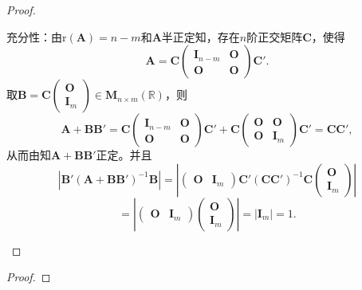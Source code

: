 \documentclass[../../main.tex]{subfiles}
\begin{document}
\begin{proof}
\begin{enumerate}[(1)]
{\heiti 充分性：}由$\mathrm{r}\left( \boldsymbol{A} \right) =n-m$和$\boldsymbol{A}$半正定知，存在$n$阶正交矩阵$\boldsymbol{C}$，使得
$$\boldsymbol{A}=\boldsymbol{C}\begin{pmatrix} \boldsymbol{I}_{n-m}&\boldsymbol{O}\\ \boldsymbol{O}&\boldsymbol{O} \end{pmatrix}\boldsymbol{C}'.$$
取$\boldsymbol{B}=\boldsymbol{C}\begin{pmatrix} \boldsymbol{O}\\ \boldsymbol{I}_m \end{pmatrix} \in \boldsymbol{M}_{n\times m}\left( \mathbb{R} \right)$，则
$$\boldsymbol{A}+\boldsymbol{BB}'=\boldsymbol{C}\begin{pmatrix} \boldsymbol{I}_{n-m}&\boldsymbol{O}\\ \boldsymbol{O}&\boldsymbol{O} \end{pmatrix}\boldsymbol{C}'+\boldsymbol{C}\begin{pmatrix} \boldsymbol{O}&\boldsymbol{O}\\ \boldsymbol{O}&\boldsymbol{I}_m \end{pmatrix}\boldsymbol{C}'=\boldsymbol{CC}',$$
从而由知$\boldsymbol{A}+\boldsymbol{BB}'$正定。并且
$$\left| \boldsymbol{B}'\left( \boldsymbol{A}+\boldsymbol{BB}' \right) ^{-1}\boldsymbol{B} \right|=\left| \begin{pmatrix} \boldsymbol{O}&\boldsymbol{I}_m \end{pmatrix}\boldsymbol{C}'\left( \boldsymbol{CC}' \right) ^{-1}\boldsymbol{C}\begin{pmatrix} \boldsymbol{O}\\ \boldsymbol{I}_m \end{pmatrix} \right|$$
$$=\left| \begin{pmatrix} \boldsymbol{O}&\boldsymbol{I}_m \end{pmatrix}\begin{pmatrix} \boldsymbol{O}\\ \boldsymbol{I}_m \end{pmatrix} \right|=\left| \boldsymbol{I}_m \right|=1.$$
\end{enumerate}

\end{proof}

\begin{example}

\end{example}
\begin{proof}


\end{proof}
\end{document}
